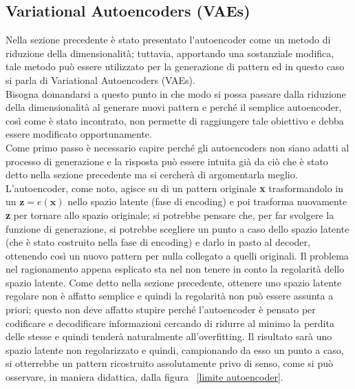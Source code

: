 \newpage

\subsection{Variational Autoencoders (VAEs)}
\label{VAEs}

Nella sezione precedente è stato presentato l'autoencoder come un metodo di riduzione della dimensionalità; tuttavia, apportando una sostanziale modifica, tale metodo può essere utilizzato per la generazione di pattern ed in questo caso si parla di Variational Autoencoders (VAEs). \\ 
Bisogna domandarsi a questo punto in che modo si possa passare dalla riduzione della dimensionalità al generare nuovi pattern e perché il semplice autoencoder, così come è stato incontrato, non permette di raggiungere tale obiettivo e debba essere modificato opportunamente. \\
Come primo passo è necessario capire perché gli autoencoders non siano adatti al processo di generazione e la risposta può essere intuita già da ciò che è stato detto nella sezione precedente ma si cercherà di argomentarla meglio. L'autoencoder, come noto, agisce su di un pattern originale \textbf{x} trasformandolo in un $\textbf{z} = e(\textbf{x})$ nello spazio latente (fase di encoding)  e poi trasforma nuovamente \textbf{z} per tornare allo spazio originale; si potrebbe pensare che, per far svolgere la funzione di generazione, si potrebbe scegliere un punto a caso dello spazio latente (che è stato costruito nella fase di encoding) e darlo in pasto al decoder, ottenendo così un nuovo pattern per nulla collegato a quelli originali. Il problema nel ragionamento appena esplicato sta nel non tenere in conto la regolarità dello spazio latente. Come detto nella sezione precedente, ottenere uno spazio latente regolare non è affatto semplice e quindi la regolarità non può essere assunta a priori; questo non deve affatto stupire perché l'autoencoder è pensato per codificare e decodificare informazioni cercando di ridurre al minimo la perdita delle stesse e quindi tenderà naturalmente all'overfitting. Il risultato sarà uno spazio latente non regolarizzato e quindi, campionando da esso un punto a caso, si otterrebbe un pattern ricostruito assolutamente privo di senso, come si può osservare, in maniera didattica, dalla figura ~\ref{limite autoencoder}. \\ 

